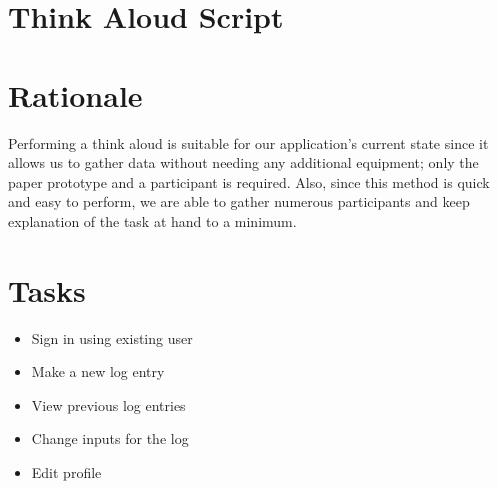 \documentclass[pdftex,12pt,a4paper]{report}
\begin{document}
\section{Think Aloud Script}
\begin{center}
\end{center}

\section{Rationale}
Performing a think aloud is suitable for our application's current state since it allows us to gather data without needing any additional equipment; only the paper prototype and a participant is required. Also, since this method is quick and easy to perform, we are able to gather numerous participants and keep explanation of the task at hand to a minimum.
\section{Tasks}
\begin{itemize}
\item Sign in using existing user
\item Make a new log entry
\item View previous log entries
\item Change inputs for the log
\item Edit profile
\end{itemize}
\end{document}
